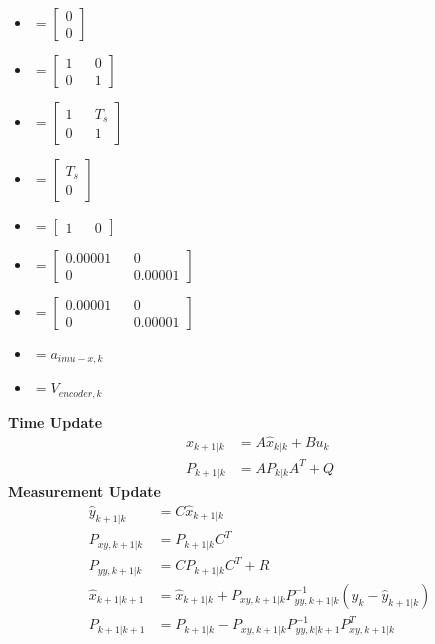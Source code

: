 	\begin{itemize}
		\item { 
			\(= \begin{bmatrix}
				0 \\
				0
			\end{bmatrix}\)}
		\item {
			\(= \begin{bmatrix}
				1 && 0\\
				0 && 1
			\end{bmatrix}\)}
		\item { 
			\(= \begin{bmatrix}
				1 && T_s\\
				0 && 1
			\end{bmatrix}\)}
		\item { 
			\(= \begin{bmatrix}
				T_s\\
				0
			\end{bmatrix}\)}
		\item { 
			\(= \begin{bmatrix}
				1 && 0
			\end{bmatrix}\)}
		\item { 
			\(= \begin{bmatrix}
				0.00001 && 0 \\
				0 && 0.00001
			\end{bmatrix}\)}
		\item { 
			\(= \begin{bmatrix}
				0.00001 && 0 \\
				0 && 0.00001
			\end{bmatrix}\)}
		\item { \(= a_{imu-x,k}\)}
		\item { \(= V_{encoder,k}\)}
	\end{itemize}
	\textbf{Time Update} \\
	\[
	\begin{split}
		\hat{x}_{k+1|k} &= A\hat{x}_{k|k} + Bu_k \\
		P_{k+1|k} &= AP_{k|k}A^T + Q
	\end{split}
	\]
	\textbf{Measurement Update} \\
	\[
	\begin{split}
		\hat{y}_{k+1|k} &= C\hat{x}_{k+1|k} \\
		P_{xy,k+1|k} &= P_{k+1|k}C^T  \\
		P_{yy,k+1|k} &= CP_{k+1|k}C^T + R \\
		\hat{x}_{k+1|k+1} &= \hat{x}_{k+1|k} + P_{xy,k+1|k}P^{-1}_{yy,k+1|k}(y_k - \hat{y}_{k+1|k}) \\
		P_{k+1|k+1} &= P_{k+1|k} - P_{xy,k+1|k}P^{-1}_{yy,k|k+1}P^T_{xy,k+1|k}
	\end{split}
	\]
	
